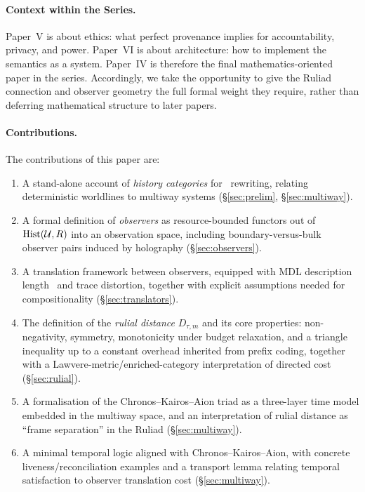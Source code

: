 \documentclass{aion}
\begin{document}
\paragraph{Context within the Series.}
Paper~V is about ethics: what perfect provenance implies for accountability, privacy, and power.
Paper~VI is about architecture: how to implement the semantics as a system.
Paper~IV is therefore the final mathematics-oriented paper in the series.
Accordingly, we take the opportunity to give the Ruliad connection and observer geometry the full formal weight
they require, rather than deferring mathematical structure to later papers.

\paragraph{Contributions.}
The contributions of this paper are:

\begin{enumerate}[leftmargin=*]
  \item A stand-alone account of \emph{history categories} for \WARP\ rewriting, relating deterministic worldlines
        to multiway systems (\S\ref{sec:prelim}, \S\ref{sec:multiway}).
  \item A formal definition of \emph{observers} as resource-bounded functors out of $\operatorname{Hist}(\mathcal{U},R)$ into an
        observation space, including boundary-versus-bulk observer pairs induced by holography (\S\ref{sec:observers}).
  \item A translation framework between observers, equipped with MDL description length~\cite{Ris78} and
        trace distortion, together with explicit assumptions needed for compositionality (\S\ref{sec:translators}).
  \item The definition of the \emph{rulial distance} $D_{\tau,m}$ and its core properties:
        non-negativity, symmetry, monotonicity under budget relaxation, and a triangle inequality up to a constant
        overhead inherited from prefix coding, together with a Lawvere-metric/enriched-category interpretation of directed cost
        (\S\ref{sec:rulial}).
  \item A formalisation of the Chronos--Kairos--Aion triad as a three-layer time model embedded in the multiway space,
        and an interpretation of rulial distance as ``frame separation'' in the Ruliad (\S\ref{sec:multiway}).
  \item A minimal temporal logic aligned with Chronos--Kairos--Aion, with concrete liveness/reconciliation examples and a
        transport lemma relating temporal satisfaction to observer translation cost (\S\ref{sec:multiway}).
\end{enumerate}
\end{document}
